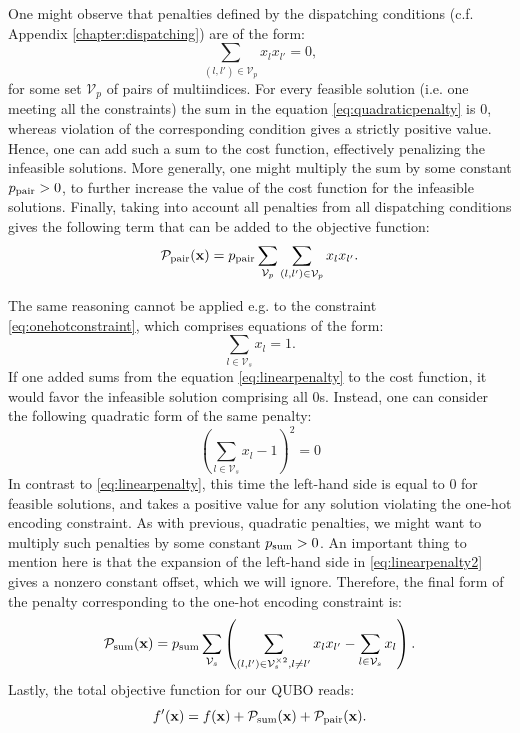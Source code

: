One might observe that penalties defined by the dispatching conditions (c.f.
Appendix \ref{chapter:dispatching}) are of the form:
\begin{equation}
  \label{eq:quadraticpenalty}
  \sum_{(l, l') \in \mathcal{V}_{p}} x_{l}x_{l'} = 0,
\end{equation}
for some set $\mathcal{V}_{p}$ of pairs of multiindices. For every feasible
solution (i.e. one meeting all the constraints) the sum in the equation
\eqref{eq:quadraticpenalty} is 0, whereas violation of the corresponding
condition gives a strictly positive value. Hence, one can add such a sum to the
cost function, effectively penalizing the infeasible solutions. More generally,
one might multiply the sum by some constant $p_{\text{pair}} > 0$, to further increase
the value of the cost function for the infeasible solutions. Finally, taking
into account all penalties from all dispatching conditions gives the following
term that can be added to the objective function:
\begin{equation}
  \mathcal{P}_{\text{pair}}(\mathbf{x}) = p_{\text{pair}} \sum_{\mathcal{V}_{p}}\sum_{(l, l') \in \mathcal{V}_{p}} x_{l}x_{l'}.
\end{equation}

The same reasoning cannot be applied e.g. to the constraint
\eqref{eq:onehotconstraint}, which comprises equations of the form:
\begin{equation}
  \label{eq:linearpenalty}
  \sum_{l \in \mathcal{V}_{s}}x_{l} = 1.
\end{equation}
If one added sums from the equation \eqref{eq:linearpenalty} to the cost
function, it would favor the infeasible solution comprising all 0s. Instead,
one can consider the following quadratic form of the same penalty:
\begin{equation}
  \label{eq:linearpenalty2}
  \left(\sum_{l \in \mathcal{V}_{s}}x_{l} -1 \right)^{2} = 0
\end{equation}
In contrast to \eqref{eq:linearpenalty}, this time the left-hand side is equal
to 0 for feasible solutions, and takes a positive value for any solution
violating the one-hot encoding constraint. As with previous, quadratic
penalties, we might want to multiply such penalties by some constant $p_{\text{sum}} >
  0$. An important thing to mention here is that the expansion of the left-hand
side in \eqref{eq:linearpenalty2} gives a nonzero constant offset, which we
will ignore. Therefore, the final form of the penalty corresponding to the
one-hot encoding constraint is:
\begin{equation}
  \mathcal{P}_{\text{sum}}(\mathbf{x}) = p_{\text{sum}} \sum_{\mathcal{V}_{s}}\left(\sum_{(l,l') \in \mathcal{V}_{s}^{\times 2}, l\ne l'} x_{l}x_{l'}  - \sum_{l \in \mathcal{V}_{s}}x_{l}\right).
\end{equation}
Lastly, the total objective function for our QUBO reads:
\begin{equation}
  f'(\mathbf{x}) = f(\mathbf{x}) + \mathcal{P}_{\text{sum}}(\mathbf{x}) + \mathcal{P}_{\text{pair}}(\mathbf{x}).
\end{equation}
